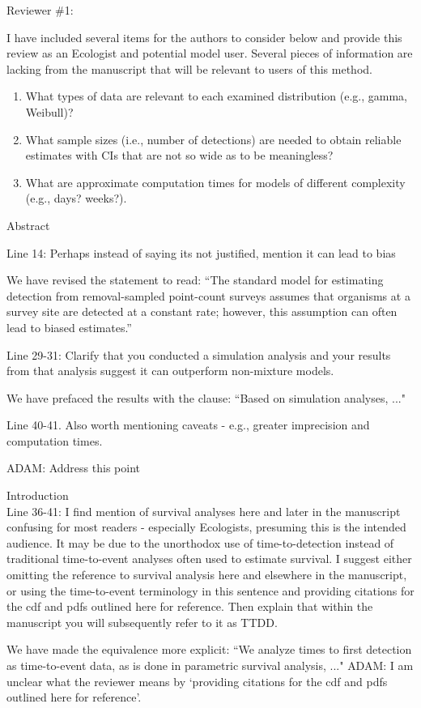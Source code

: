 \documentclass[12pt]{article}
\renewenvironment{quote}  %
              {\list{}{\rightmargin\leftmargin}\normalfont%
               \item\relax}
              {\endlist}
\newcommand{\adam}[1]{{\color{blue} ADAM: #1}}
\begin{document}
\newpage



Reviewer \#1:

I have included several items for the authors to consider below and provide this review as an Ecologist and potential model user.
Several pieces of information are lacking from the manuscript that will be relevant to users of this method.
\begin{enumerate}
\item What types of data are relevant to each examined distribution (e.g., gamma, Weibull)?
\item What sample sizes (i.e., number of detections) are needed to obtain reliable estimates with CIs that are not so wide as to be meaningless?
\item What are approximate computation times for models of different complexity (e.g., days? weeks?).
\end{enumerate}

Abstract

Line 14: Perhaps instead of saying its not justified, mention it can lead to bias
\begin{quote}
We have revised the statement to read: ``The standard model for estimating detection from removal-sampled point-count surveys assumes that organisms at a survey site are detected at a constant rate; however, this assumption can often lead to biased estimates.''
\end{quote}

Line 29-31: Clarify that you conducted a simulation analysis and your results from that analysis suggest it can outperform non-mixture models.
\begin{quote}
We have prefaced the results with the clause: ``Based on simulation analyses, ..."
\end{quote}

Line 40-41.  Also worth mentioning caveats - e.g., greater imprecision and computation times.
\begin{quote}
\adam{Address this point}
\end{quote}

Introduction\\
Line 36-41: I find mention of survival analyses here and later in the manuscript confusing for most readers - especially Ecologists, presuming this is the intended audience.  It may be due to the unorthodox use of time-to-detection instead of traditional time-to-event analyses often used to estimate survival.  I suggest either omitting the reference to survival analysis here and elsewhere in the manuscript, or using the time-to-event terminology in this sentence and providing citations for the cdf and pdfs outlined here for reference.  Then explain that within the manuscript you will subsequently refer to it as TTDD.  
\begin{quote}
We have made the equivalence more explicit: ``We analyze times to first detection as time-to-event data, as is done in parametric survival analysis, ..."
\adam{I am unclear what the reviewer means by `providing citations for the cdf and pdfs outlined here for reference'.}
\end{quote}
\end{document}
